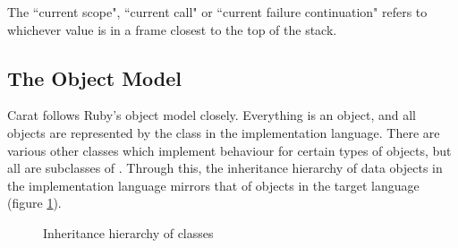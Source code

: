 The ``current scope", ``current call" or ``current failure continuation" refers to whichever value is in a frame closest to the top of the stack.

\subsection{The Object Model}
\label{sec:object_model}

Carat follows Ruby's object model closely. Everything is an object, and all objects are represented by the class  in the implementation language. There are various other classes which implement behaviour for certain types of objects, but all are subclasses of . Through this, the inheritance hierarchy of data objects in the implementation language mirrors that of objects in the target language (figure \ref{fig:data_object_hierarchy}).

\begin{figure}
\begin{center}
\caption{Inheritance hierarchy of  classes}
\label{fig:data_object_hierarchy}
\end{center}
\end{figure}

\subsubsection{}

